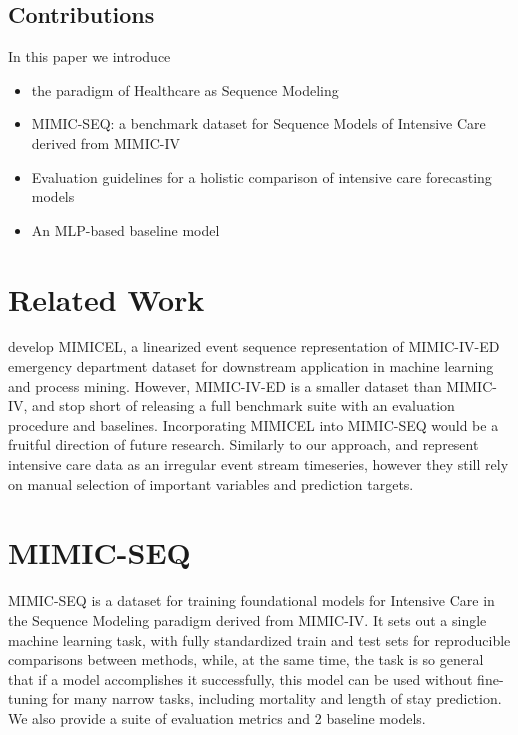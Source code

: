 \subsection{Contributions}

In this paper we introduce
\begin{itemize}
    \item the paradigm of Healthcare as Sequence Modeling
    \item MIMIC-SEQ: a benchmark dataset for Sequence Models of Intensive Care derived from MIMIC-IV
    \item Evaluation guidelines for a holistic comparison of intensive care forecasting models
    \item An MLP-based baseline model
\end{itemize}

\section{Related Work}

\cite{weiMIMICELMIMICIVEvent2022} develop MIMICEL, a linearized event sequence representation of MIMIC-IV-ED \cite{johnsonMIMICIVED2021} emergency department dataset for downstream application in machine learning and process mining. 
However, MIMIC-IV-ED is a smaller dataset than MIMIC-IV, and \cite{weiMIMICELMIMICIVEvent2022} stop short of releasing a full benchmark suite with an evaluation procedure and baselines.
Incorporating MIMICEL into MIMIC-SEQ would be a fruitful direction of future research.
Similarly to our approach,
\cite{kuznetsovaImportanceStepwiseEmbeddings2023} and \cite{tipirneniSelfSupervisedTransformerSparse2022} represent intensive care data as an irregular event stream timeseries, however they still rely on manual selection of important variables and prediction targets.

\section{MIMIC-SEQ}
\label{sec:dataset}

MIMIC-SEQ is a dataset for training foundational models for Intensive Care in the Sequence Modeling paradigm derived from MIMIC-IV.
It sets out a single machine learning task, with fully standardized train and test sets for reproducible comparisons between methods, while, at the same time, the task is so general that if a model accomplishes it successfully, this model can be used without fine-tuning for many narrow tasks, including mortality and length of stay prediction.
We also provide a suite of evaluation metrics and 2 baseline models.


